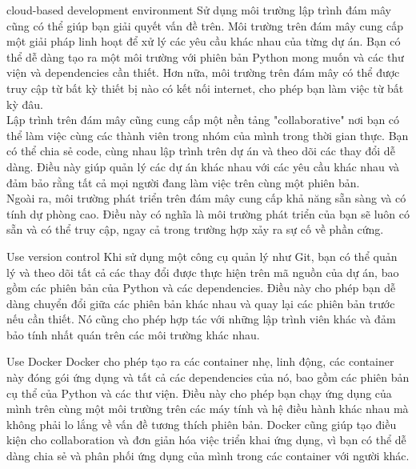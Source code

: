 \documentclass[12pt]{amsart}
\begin{document}
\begin{section}{cloud-based development environment}
    Sử dụng môi trường lập trình đám mây cũng có thể giúp bạn giải quyết vấn đề trên. Môi trường trên đám mây cung cấp một giải pháp linh hoạt để xử lý các yêu cầu khác nhau của từng dự án. Bạn có thể dễ dàng tạo ra một môi trường với phiên bản Python mong muốn và các thư viện và dependencies cần thiết. Hơn nữa, môi trường trên đám mây có thể được truy cập từ bất kỳ thiết bị nào có kết nối internet, cho phép bạn làm việc từ bất kỳ đâu. \\

Lập trình trên đám mây cũng cung cấp một nền tảng "collaborative" nơi bạn có thể làm việc cùng các thành viên trong nhóm của mình trong thời gian thực. Bạn có thể chia sẻ code, cùng nhau lập trình trên dự án và theo dõi các thay đổi dễ dàng. Điều này giúp quản lý các dự án khác nhau với các yêu cầu khác nhau và đảm bảo rằng tất cả mọi người đang làm việc trên cùng một phiên bản. \\

Ngoài ra, môi trường phát triển trên đám mây cung cấp khả năng sẵn sàng và có tính dự phòng cao. Điều này có nghĩa là môi trường phát triển của bạn sẽ luôn có sẵn và có thể truy cập, ngay cả trong trường hợp xảy ra sự cố về phần cứng.

\end{section}
\begin{section}{Use version control}
    Khi sử dụng một công cụ quản lý như Git, bạn có thể quản lý và theo dõi tất cả các thay đổi được thực hiện trên mã nguồn của dự án, bao gồm các phiên bản của Python và các dependencies. Điều này cho phép bạn dễ dàng chuyển đổi giữa các phiên bản khác nhau và quay lại các phiên bản trước nếu cần thiết. Nó cũng cho phép hợp tác với những lập trình viên khác và đảm bảo tính nhất quán trên các môi trường khác nhau.
\end{section}
\begin{section}{Use Docker}
    Docker cho phép tạo ra các container nhẹ, linh động, các container này đóng gói ứng dụng và tất cả các dependencies của nó, bao gồm các phiên bản cụ thể của Python và các thư viện. Điều này cho phép bạn chạy ứng dụng của mình trên cùng một môi trường trên các máy tính và hệ điều hành khác nhau mà không phải lo lắng về vấn đề tương thích phiên bản. Docker cũng giúp tạo điều kiện cho collaboration và đơn giản hóa việc triển khai ứng dụng, vì bạn có thể dễ dàng chia sẻ và phân phối ứng dụng của mình trong các container với người khác.
\end{section}
\end{document}
